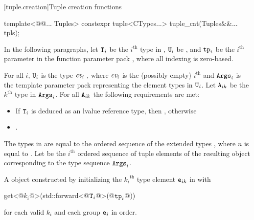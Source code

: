 \documentclass{wg21}
\begin{document}
[tuple.creation]{Tuple creation functions}


\begin{itemdecl}
template<@@... Tuples>
constexpr tuple<CTypes...> tuple_cat(Tuples&&... tpls);
\end{itemdecl}

\begin{itemdescr}
\pnum
In the following paragraphs, let $\texttt{T}_i$ be the $i^\text{th}$ type in ,
$\texttt{U}_i$ be , and $\texttt{tp}_i$ be the $i^\text{th}$
parameter in the function parameter pack , where all indexing is
zero-based.

\pnum
\expects
For all $i$, $\texttt{U}_i$ is the type
$\textit{cv}_i$ , where $\textit{cv}_i$ is the (possibly empty) $i^\text{th}$
 and $\texttt{Args}_i$ is the template parameter pack representing the element
types in $\texttt{U}_i$. Let $\texttt{A}_{ik}$ be the ${k}^\text{th}$ type in $\texttt{Args}_i$. For all
$\texttt{A}_{ik}$ the following requirements are met:


\begin{itemize}
    \item If $\texttt{T}_i$ is deduced as an lvalue reference type, then
    , otherwise
    \item {}.
\end{itemize}

\pnum
\remarks
The types in  are equal to the ordered
sequence of the extended types
,
where $n$ is
equal to . Let  be the $i^\text{th}$
ordered sequence of tuple elements of the resulting  object
corresponding to the type sequence $\texttt{Args}_i$.

\pnum
\returns
A  object constructed by initializing the ${k_i}^\text{th}$
type element $\texttt{e}_{ik}$ in  with
\begin{codeblock}
    get<@$k_i$@>(std::forward<@$\texttt{T}_i$@>(@$\texttt{tp}_i$@))
\end{codeblock}
for each valid $k_i$ and each group $\texttt{e}_i$ in order.


\end{itemdescr}
\end{document}
